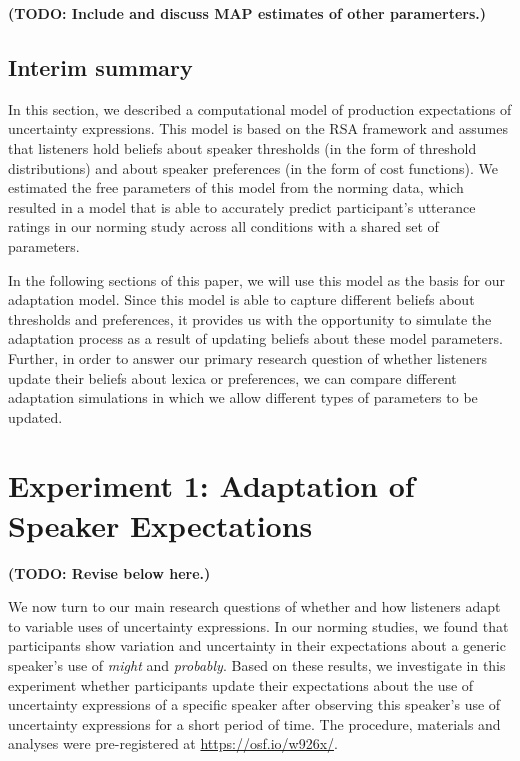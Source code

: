 \documentclass[lucida,biblatex]{sp} %
\newcommand{\todo}[1]{}
\renewcommand{\todo}[1]{{\bf \color{red} (TODO: {#1})}}
\begin{document}
 \todo{Include and discuss MAP estimates of other paramerters.}
 
 \subsection{Interim summary}
 
 In this section, we described a computational model of production expectations of uncertainty expressions. This model
 is based on the RSA framework and assumes that listeners hold beliefs about speaker thresholds (in the form
 of threshold distributions) and about speaker preferences (in the form of cost functions). We estimated 
 the free parameters of this model from the norming data, which resulted in a model that is able to accurately predict
 participant's utterance ratings in our norming study across all conditions with a shared set of parameters.
 
 In the following sections of this paper, we will use this model as the basis for our adaptation model. Since this model
 is able to capture different beliefs about thresholds and preferences, it provides us with the opportunity to simulate 
 the adaptation process as a result of updating beliefs about these model parameters. Further, in order to answer
 our primary research question of whether listeners update their beliefs about lexica or preferences, we can compare
 different adaptation simulations in which we allow different types of parameters to be updated.





\section{Experiment 1: Adaptation of Speaker Expectations}
\label{sec:exp-prod-adaptation}

\todo{Revise below here.}


We now turn to our main research questions of whether and how listeners adapt to variable uses of uncertainty expressions.
In our norming studies, we found that participants show variation and uncertainty in their expectations about a generic speaker's 
use of \textit{might} and \textit{probably}. Based on these results, we investigate in this experiment whether participants update 
their expectations about the use of uncertainty expressions of a specific speaker after observing this speaker's use of 
uncertainty expressions for a short period of time. The procedure, materials and analyses were pre-registered at \url{https://osf.io/w926x/}.
\end{document}
